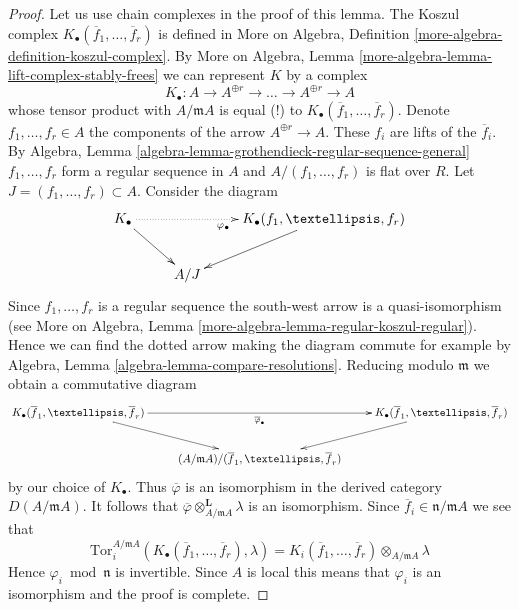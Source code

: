 \documentclass{stacks-project}
\theoremstyle{plain}
\theoremstyle{definition}
\theoremstyle{remark}
\numberwithin{equation}{subsection}
\begin{document}
\begin{proof}
Let us use chain complexes in the proof of this lemma.
The Koszul complex $K_\bullet(\overline{f}_1, \ldots, \overline{f}_r)$
is defined in More on Algebra, Definition
\ref{more-algebra-definition-koszul-complex}.
By More on Algebra, Lemma \ref{more-algebra-lemma-lift-complex-stably-frees}
we can represent $K$ by a complex
$$
K_\bullet :
A \to A^{\oplus r} \to \ldots \to A^{\oplus r} \to A
$$
whose tensor product with $A/\mathfrak mA$ is equal (!)
to $K_\bullet(\overline{f}_1, \ldots, \overline{f}_r)$.
Denote $f_1, \ldots, f_r \in A$ the components of the
arrow $A^{\oplus r} \to A$. These $f_i$ are lifts of the
$\overline{f}_i$. By Algebra, Lemma
\ref{algebra-lemma-grothendieck-regular-sequence-general}
$f_1, \ldots, f_r$ form a regular sequence in $A$ and $A/(f_1, \ldots, f_r)$
is flat over $R$. Let $J = (f_1, \ldots, f_r) \subset A$.
Consider the diagram
$$
\xymatrix{
K_\bullet \ar[rd] \ar@{..>}[rr]_{\varphi_\bullet} & &
K_\bullet(f_1, \ldots, f_r) \ar[ld] \\
& A/J
}
$$
Since $f_1, \ldots, f_r$ is a regular sequence the south-west arrow
is a quasi-isomorphism (see
More on Algebra, Lemma \ref{more-algebra-lemma-regular-koszul-regular}).
Hence we can find the dotted arrow making the
diagram commute for example by
Algebra, Lemma \ref{algebra-lemma-compare-resolutions}.
Reducing modulo $\mathfrak m$ we obtain a commutative diagram
$$
\xymatrix{
K_\bullet(\overline{f}_1, \ldots, \overline{f}_r)
\ar[rd] \ar[rr]_{\overline{\varphi}_\bullet} & &
K_\bullet(\overline{f}_1, \ldots, \overline{f}_r) \ar[ld] \\
& (A/\mathfrak m A)/(\overline{f}_1, \ldots, \overline{f}_r)
}
$$
by our choice of $K_\bullet$. Thus $\overline{\varphi}$ is an isomorphism
in the derived category $D(A/\mathfrak m A)$. It follows that
$\overline{\varphi} \otimes_{A/\mathfrak m A}^\mathbf{L} \lambda$
is an isomorphism. Since $\overline{f}_i \in \mathfrak n / \mathfrak m A$
we see that
$$
\text{Tor}_i^{A/\mathfrak m A}(
K_\bullet(\overline{f}_1, \ldots, \overline{f}_r), \lambda)
=
K_i(\overline{f}_1, \ldots, \overline{f}_r) \otimes_{A/\mathfrak m A} \lambda
$$
Hence $\varphi_i \bmod \mathfrak n$ is invertible.
Since $A$ is local this means that $\varphi_i$ is an
isomorphism and the proof is complete.
\end{proof}
\end{document}
